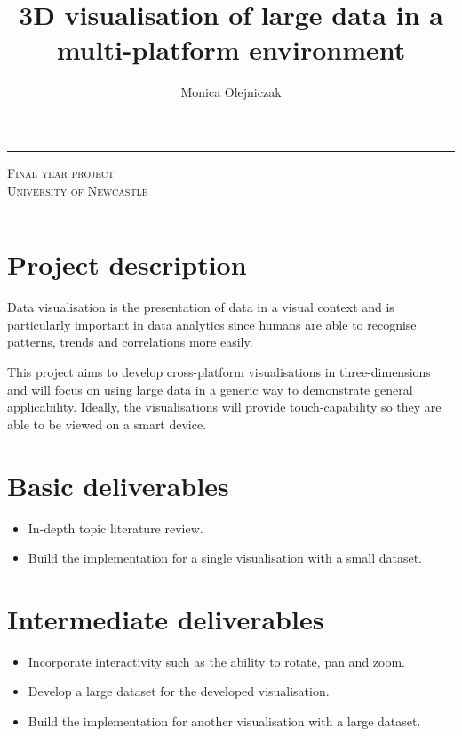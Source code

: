 \documentclass[a4paper]{article}
\title{3D visualisation of large data in a multi-platform environment}
\author{Monica Olejniczak}
\begin{document}
	\makeatletter
	\begin{titlepage}
		\vspace*{\fill}
		\begin{center}
			\Huge\textbf{\textsf{\@title}}
			\rule{\textwidth}{1pt}
			\LARGE\textsc{Final year project} \\
			\Large\textsc{University of Newcastle}
			\rule{\textwidth}{1pt}
			\Large\textbf{\textsf{\@author}}
        \end{center}
		\vspace*{\fill}
	\end{titlepage}
	\makeatother
	
	\section{Project description} {
	
		Data visualisation is the presentation of data in a visual context and is particularly important in data analytics since humans are able to recognise patterns, trends and correlations more easily.
		
		This project aims to develop cross-platform visualisations in three-dimensions and will focus on using large data in a generic way to demonstrate general applicability. Ideally, the visualisations will provide touch-capability so they are able to be viewed on a smart device.
	
	}
	
	\section{Basic deliverables} {

		\begin{itemize}
			\item In-depth topic literature review.
			\item Build the implementation for a single visualisation with a small dataset.
		\end{itemize}
	
	}
	
	\section{Intermediate deliverables} {
	
		\begin{itemize}
			\item Incorporate interactivity such as the ability to rotate, pan and zoom.
			\item Develop a large dataset for the developed visualisation.
			\item Build the implementation for another visualisation with a large dataset.
		\end{itemize}	
	
	}
	
\end{document}
